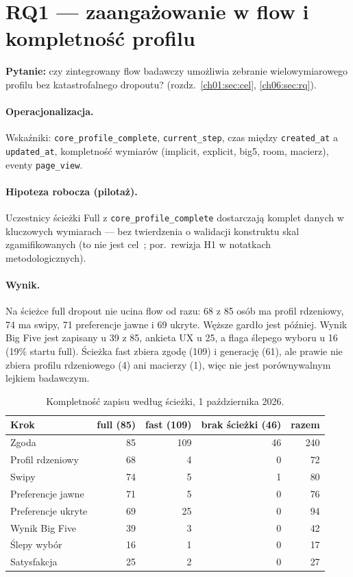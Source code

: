\section{RQ1 --- zaangażowanie w flow i kompletność profilu}
\label{ch08:sec:rq1}

\textbf{Pytanie:} czy zintegrowany flow badawczy umożliwia zebranie wielowymiarowego profilu bez katastrofalnego dropoutu? (rozdz.~\ref{ch01:sec:cel}, \ref{ch06:sec:rq}).

\paragraph{Operacjonalizacja.}
Wskaźniki: \texttt{core\_profile\_complete}, \texttt{current\_step}, czas między \texttt{created\_at} a \texttt{updated\_at}, kompletność wymiarów (implicit, explicit, big5, room, macierz), eventy \texttt{page\_view}.

\paragraph{Hipoteza robocza (pilotaż).}
Uczestnicy ścieżki Full z \texttt{core\_profile\_complete} dostarczają komplet danych w kluczowych wymiarach --- bez twierdzenia o walidacji konstruktu skal zgamifikowanych (to nie jest cel~; por.\ rewizja H1 w notatkach metodologicznych).

\paragraph{Wynik.}
Na ścieżce full dropout nie ucina flow od razu: 68 z 85 osób ma profil rdzeniowy, 74 ma swipy, 71 preferencje jawne i 69 ukryte. Węższe gardło jest później. Wynik Big Five jest zapisany u 39 z 85, ankieta UX u 25, a flaga ślepego wyboru u 16 (19\% startu full). Ścieżka fast zbiera zgodę (109) i generację (61), ale prawie nie zbiera profilu rdzeniowego (4) ani macierzy (1), więc nie jest porównywalnym lejkiem badawczym.

\begin{table}[htbp]
  \centering
  \small
  \caption{Kompletność zapisu według ścieżki, 1 października 2026.}
  \label{tab:ch08:completeness}
  \begin{tabular}{lrrrr}
    \toprule
    Krok & full (85) & fast (109) & brak ścieżki (46) & razem \\
    \midrule
    Zgoda & 85 & 109 & 46 & 240 \\
    Profil rdzeniowy & 68 & 4 & 0 & 72 \\
    Swipy & 74 & 5 & 1 & 80 \\
    Preferencje jawne & 71 & 5 & 0 & 76 \\
    Preferencje ukryte & 69 & 25 & 0 & 94 \\
    Wynik Big Five & 39 & 3 & 0 & 42 \\
    Ślepy wybór & 16 & 1 & 0 & 17 \\
    Satysfakcja & 25 & 2 & 0 & 27 \\
    \bottomrule
  \end{tabular}
\end{table}

